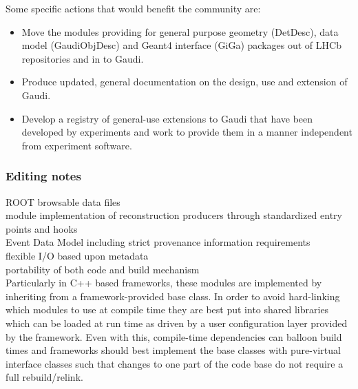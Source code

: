 \noindent Some specific actions that would benefit the community are:

\begin{itemize}
\item Move the modules providing for general purpose geometry
  (DetDesc), data model (GaudiObjDesc) and Geant4 interface (GiGa)
  packages out of LHCb repositories and in to Gaudi.
\item Produce updated, general documentation on the design, use and extension of Gaudi.
\item Develop a registry of general-use extensions to Gaudi that have
  been developed by experiments and work to provide them in a manner
  independent from experiment software.
\end{itemize}



\subsubsection{Editing notes}



	ROOT browsable data files\\
	module implementation of reconstruction producers through standardized entry points and hooks\\
	Event Data Model including strict provenance information requirements\\
	flexible I/O based upon metadata\\
	portability of both code and build mechanism\\
	
	Particularly in C++ based frameworks,
these modules are implemented by inheriting from a framework-provided
base class. In order to avoid hard-linking which modules to use at
compile time they are best put into shared libraries which can be
loaded at run time as driven by a user configuration layer provided by
the framework.  Even with this, compile-time dependencies can balloon
build times and frameworks should best implement the base classes with
pure-virtual interface classes such that changes to one part of the
code base do not require a full rebuild/relink.

